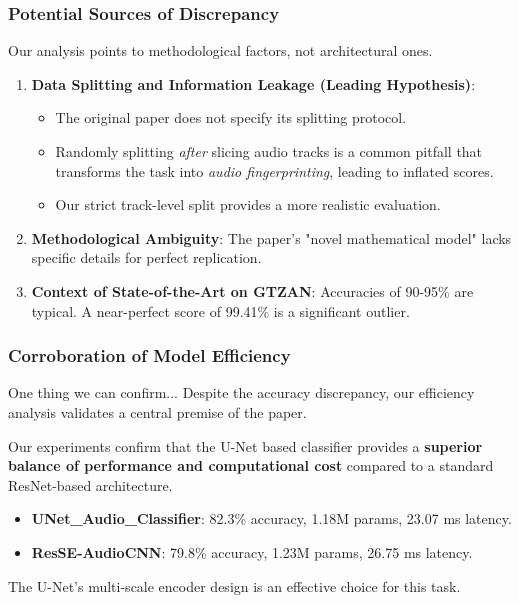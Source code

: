 \documentclass{beamer}
\begin{document}
\begin{frame}
    \frametitle{Potential Sources of Discrepancy}
    Our analysis points to methodological factors, not architectural ones.
    \begin{enumerate}
        \item \textbf{Data Splitting and Information Leakage (Leading Hypothesis)}:
        \begin{itemize}
            \item The original paper does not specify its splitting protocol.
            \item Randomly splitting \textit{after} slicing audio tracks is a common pitfall that transforms the task into \textit{audio fingerprinting}, leading to inflated scores.
            \item Our strict track-level split provides a more realistic evaluation.
        \end{itemize}
        \vspace{0.3cm}
        \item \textbf{Methodological Ambiguity}: The paper's "novel mathematical model" lacks specific details for perfect replication.
        \vspace{0.3cm}
        \item \textbf{Context of State-of-the-Art on GTZAN}: Accuracies of 90-95\% are typical. A near-perfect score of 99.41\% is a significant outlier.
    \end{enumerate}
\end{frame}

\begin{frame}
    \frametitle{Corroboration of Model Efficiency}
    \begin{block}{One thing we can confirm...}
        Despite the accuracy discrepancy, our efficiency analysis validates a central premise of the paper.
    \end{block}
    
    Our experiments confirm that the U-Net based classifier provides a \textbf{superior balance of performance and computational cost} compared to a standard ResNet-based architecture.
    
    \begin{itemize}
        \item \textbf{UNet\_Audio\_Classifier}: 82.3\% accuracy, 1.18M params, 23.07 ms latency.
        \item \textbf{ResSE-AudioCNN}: 79.8\% accuracy, 1.23M params, 26.75 ms latency.
    \end{itemize}
    
    The U-Net's multi-scale encoder design is an effective choice for this task.
\end{frame}
\end{document}
